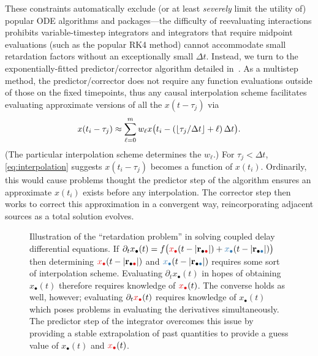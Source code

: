 These constraints automatically exclude (or at least \emph{severely} limit the utility of) popular ODE algorithms and packages---the difficulty of reevaluating interactions prohibits variable-timestep integrators and integrators that require midpoint evaluations (such as the popular RK4 method) cannot accommodate small retardation factors without an exceptionally small $\Delta t$.
Instead, we turn to the exponentially-fitted predictor/corrector algorithm detailed in~\cite{Glaser2009}.
As a multistep method, the predictor/corrector does not require any function evaluations outside of those on the fixed timepoints, thus any causal interpolation scheme facilitates evaluating approximate versions of all the $x(t - \tau_j)$ via
\begin{equation}
  x(t_i - \tau_j) \approx \sum_{\ell = 0}^m w_\ell x\qty\big(t_i - (\lfloor\tau_j/\Delta t\rfloor + \ell)\, \Delta t).
  \label{eq:interpolation}
\end{equation}
(The particular interpolation scheme determines the $w_\ell$.)
For $\tau_j < \Delta t$, \cref{eq:interpolation} suggests $x(t_i - \tau_j)$ becomes a function of $x(t_i)$.
Ordinarily, this would cause problems thought the predictor step of the algorithm ensures an approximate $x(t_i)$ exists before any interpolation.
The corrector step then works to correct this approximation in a convergent way, reincorporating adjacent sources as a total solution evolves.
  
\begin{figure}[]
  \centering
  \caption{\label{fig:retardation problem} Illustration of the ``retardation problem'' in solving coupled delay differential equations.
    If $\partial_t x_\bullet(t) = f\qty\big(\textcolor[RGB]{228,26,28}{x_\bullet}(t - \abs{\vb{r}_{\bullet \textcolor[RGB]{228,26,28}{\bullet}}}) + \textcolor[RGB]{55,126,184}{x_\bullet}(t - \abs{\vb{r}_{\bullet \textcolor[RGB]{55,126,184}{\bullet}}}))$ then determining $\textcolor[RGB]{228,26,28}{x_\bullet}(t - \abs{\vb{r}_{\bullet \textcolor[RGB]{228,26,28}{\bullet}}})$ and $\textcolor[RGB]{55,126,184}{x_\bullet}(t - \abs{\vb{r}_{\bullet \textcolor[RGB]{55,126,184}{\bullet}}})$ requires some sort of interpolation scheme.
    Evaluating $\partial_t x_\bullet(t)$ in hopes of obtaining $x_\bullet(t)$ therefore requires knowledge of $\textcolor[RGB]{228,26,28}{x_\bullet}(t)$.
    The converse holds as well, however; evaluating $\partial_t \textcolor[RGB]{228,26,28}{x_\bullet}(t)$ requires knowledge of $x_\bullet(t)$ which poses problems in evaluating the derivatives simultaneously.
    The predictor step of the integrator overcomes this issue by providing a stable extrapolation of past quantities to provide a guess value of $x_\bullet(t)$ and $\textcolor[RGB]{228,26,28}{x_\bullet}(t)$.
  }
\end{figure}

